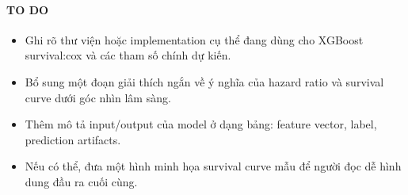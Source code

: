 \paragraph{TO DO}
\begin{itemize}
    \item Ghi rõ thư viện hoặc implementation cụ thể đang dùng cho XGBoost survival:cox và các tham số chính dự kiến.
    \item Bổ sung một đoạn giải thích ngắn về ý nghĩa của hazard ratio và survival curve dưới góc nhìn lâm sàng.
    \item Thêm mô tả input/output của model ở dạng bảng: feature vector, label, prediction artifacts.
    \item Nếu có thể, đưa một hình minh họa survival curve mẫu để người đọc dễ hình dung đầu ra cuối cùng.
\end{itemize}